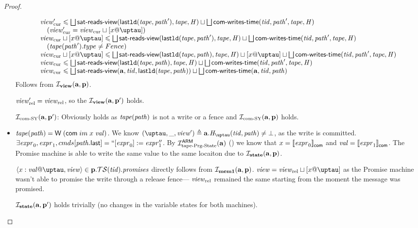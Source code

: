 \begin{proof}
\begin{itemize}
  \[\begin{array}{l}
    \Rcur' \le \bigsqcup \readsSatisfiedR(\lastLD(\tape, \cpath'), \tape, \hmap)
                 \sqcup \bigsqcup \opstau(\tId, \cpath', \tape, \hmap) \\
    \quad (\Rcur' = \Rcur \sqcup [x@\tau]) \\
    \Rcur \sqcup [x @ \tau] \le \bigsqcup \readsSatisfiedR(\lastLD(\tape, \cpath'), \tape, \hmap)
                 \sqcup \bigsqcup \opstau(\tId, \cpath', \tape, \hmap) \\
    \quad (\tape(\cpath').type \not = Fence) \\
    \Rcur \sqcup [x @ \tau] \le \bigsqcup \readsSatisfiedR(\lastLD(\tape, \cpath), \tape, \hmap)
                 \sqcup [x @ \tau] \sqcup \bigsqcup \opstau(\tId, \cpath', \tape, \hmap) \\
    \Rcur \le \bigsqcup \readsSatisfiedR(\lastLD(\tape, \cpath), \tape, \hmap)
                 \sqcup \bigsqcup \opstau(\tId, \cpath', \tape, \hmap) \\
    \Rcur \le \bigsqcup \readsSatisfiedR(\aT, \tId, \lastLD(\tape, \cpath)) \sqcup \bigsqcup \opstau(\aT, \tId, \cpath) \\
  \end{array}\]
    Follows from $\mathcal{I}_{\rm \bf view}(\mathbf{a}, \mathbf{p})$.
    
    $\mathit{view}_{\mathrm{rel}}' = \mathit{view}_{\mathrm{rel}}$, so the $\mathcal{I}_{\rm \bf view}(\mathbf{a}, \mathbf{p}')$ holds.

    $\mathcal{I}_{\textup{\rm com-SY}}(\mathbf{a}, \mathbf{p}')$: Obviously holds as $\mathit{tape}(\mathit{path})$ is not a write or a fence and $\mathcal{I}_{\textup{\rm com-SY}}(\mathbf{a}, \mathbf{p})$ holds.

  \item $\mathit{tape}(\mathit{path}) = \textsf{W} \; (\mathsf{com} \; im \; x \; \mathit{val})$.
    We know $(\tau, \_, \R') \triangleq \aT.\tmap(\tId, \cpath) \not = \bot$, as the write is committed.
    $\exists \mathit{expr}_0, \mathit{expr}_1, {cmds}[\mathit{path}.\textup{\sf last}] = ``[\mathit{expr}_0] := \mathit{expr}_1''$.
    By $\mathcal{I}^\mathsf{ARM}_{\textup{\rm {tape-Prg-State}}}(\mathbf{a})$ (\app{\ref{inv:invATapeCfState}}) we know that $x = \llbracket\mathit{expr}_0\rrbracket ^{}_\mathsf{com}$ and
    $\mathit{val} = \llbracket\mathit{expr}_1\rrbracket ^{}_\mathsf{com}$. The Promise machine is able to write the same value to the same locaiton
    due to $\mathcal{I}_{\rm \bf state}(\mathbf{a}, \mathbf{p})$.

    $\writeEvt{x}{\stval}{\tau}{\R} \in \p.\TSfprom(\tId).\PromSet$
    directly follows from $\mathcal{I}_{\rm \bf mem1}(\mathbf{a}, \mathbf{p})$.
    $\R = \Rrel \sqcup [x@\tau]$ as the Promise machine wasn't able to promise the write through a release fence---
    $\mathit{view}_{\mathrm{rel}}$ remained the same starting from the moment the message was promised.

    $\mathcal{I}_{\rm \bf state}(\mathbf{a}, \mathbf{p}')$ holds trivially (no changes in the variable states for both machines).


\end{itemize}
\end{proof}
